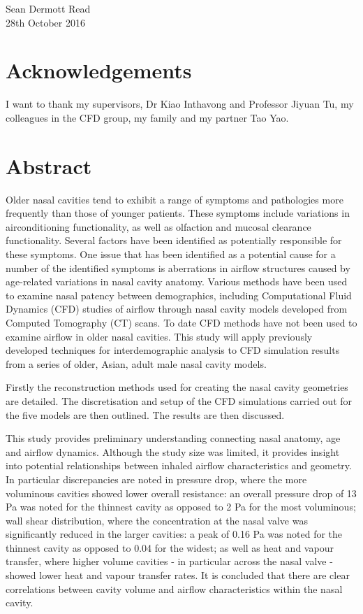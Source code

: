 \documentclass[12pt]{report}
\begin{document}
\vspace{0.3cm}
\noindent
Sean Dermott Read\\

\noindent
28th October 2016
\chapter*{Acknowledgements}
I want to thank my supervisors, Dr Kiao Inthavong and Professor Jiyuan Tu, my colleagues in the CFD group, my family and my partner Tao Yao. 

\tableofcontents

\newpage
\listoffigures
\listoftables

\chapter*{Abstract}
Older nasal cavities tend to exhibit a range of symptoms and pathologies more frequently than those of younger patients. These symptoms include variations in airconditioning functionality, as well as olfaction and mucosal clearance functionality. 
Several factors have been identified as potentially responsible for these symptoms. 
One issue that has been identified as a potential cause for a number of the identified symptoms is aberrations in airflow structures caused by age-related variations in nasal cavity anatomy. 
Various methods have been used to examine nasal patency between demographics, including Computational Fluid Dynamics (CFD) studies of airflow through nasal cavity models developed from Computed Tomography (CT) scans. 
To date CFD methods have not been used to examine airflow in older nasal cavities.
This study will apply previously developed techniques for interdemographic analysis to CFD simulation results from a series of older, Asian, adult male nasal cavity models.


Firstly the reconstruction methods used for creating the nasal cavity geometries are detailed.
The discretisation and setup of the CFD simulations carried out for the five models are then outlined.
The results are then discussed.


This study provides preliminary understanding connecting nasal anatomy, age and airflow dynamics. Although the study size was limited, it provides insight into potential relationships between inhaled airflow characteristics and geometry. In particular discrepancies are noted in pressure drop, where the more voluminous cavities showed lower overall resistance: an overall pressure drop of 13 Pa was noted for the thinnest cavity as opposed to 2 Pa for the most voluminous; wall shear distribution, where the concentration at the nasal valve was significantly reduced in the larger cavities: a peak of 0.16 Pa was noted for the thinnest cavity as opposed to 0.04 for the widest; as well as heat and vapour transfer, where higher volume cavities - in particular across the nasal valve - showed lower heat and vapour transfer rates. It is concluded that there are clear correlations between cavity volume and airflow characteristics within the nasal cavity.
\end{document}
